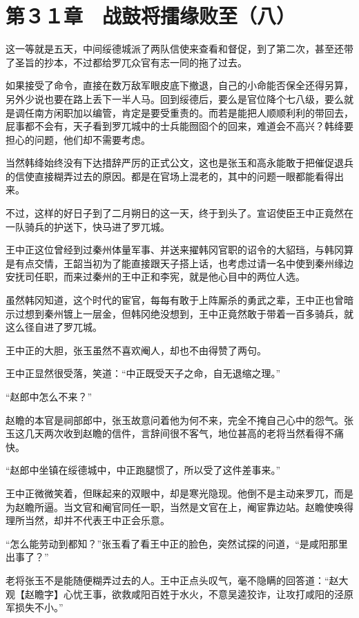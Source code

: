 \section{第３１章　战鼓将擂缘败至（八） }

这一等就是五天，中间绥德城派了两队信使来查看和督促，到了第二次，甚至还带了圣旨的抄本，不过都给罗兀众官有志一同的拖了过去。

如果接受了命令，直接在数万敌军眼皮底下撤退，自己的小命能否保全还得另算，另外少说也要在路上丢下一半人马。回到绥德后，要么是官位降个七八级，要么就是调任南方闲职加以编管，肯定是要受重责的。而若是能把人顺顺利利的带回去，屁事都不会有，天子看到罗兀城中的士兵能囫囵个的回来，难道会不高兴？韩绛要担心的问题，他们却不需要考虑。

当然韩绛始终没有下达措辞严厉的正式公文，这也是张玉和高永能敢于把催促退兵的信使直接糊弄过去的原因。都是在官场上混老的，其中的问题一眼都能看得出来。

不过，这样的好日子到了二月朔日的这一天，终于到头了。宣诏使臣王中正竟然在一队骑兵的护送下，快马进了罗兀城。

王中正这位曾经到过秦州体量军事、并送来擢韩冈官职的诏令的大貂珰，与韩冈算是有点交情，王韶当初为了能直接跟天子搭上话，也考虑过请一名中使到秦州缘边安抚司任职，而来过秦州的王中正和李宪，就是他心目中的两位人选。

虽然韩冈知道，这个时代的宦官，每每有敢于上阵厮杀的勇武之辈，王中正也曾暗示过想到秦州镀上一层金，但韩冈绝没想到，王中正竟然敢于带着一百多骑兵，就这么径自进了罗兀城。

王中正的大胆，张玉虽然不喜欢阉人，却也不由得赞了两句。

王中正显然很受落，笑道：“中正既受天子之命，自无退缩之理。”

“赵郎中怎么不来？”

赵瞻的本官是祠部郎中，张玉故意问着他为何不来，完全不掩自己心中的怨气。张玉这几天两次收到赵瞻的信件，言辞间很不客气，地位甚高的老将当然看得不痛快。

“赵郎中坐镇在绥德城中，中正跑腿惯了，所以受了这件差事来。”

王中正微微笑着，但眯起来的双眼中，却是寒光隐现。他倒不是主动来罗兀，而是为赵瞻所逼。当文官和阉官同任一职，当然是文官在上，阉宦靠边站。赵瞻使唤得理所当然，却并不代表王中正会乐意。

“怎么能劳动到都知？”张玉看了看王中正的脸色，突然试探的问道，“是咸阳那里出事了？”

老将张玉不是能随便糊弄过去的人。王中正点头叹气，毫不隐瞒的回答道：“赵大观【赵瞻字】心忧王事，欲救咸阳百姓于水火，不意吴逵狡诈，让攻打咸阳的泾原军损失不小。”

